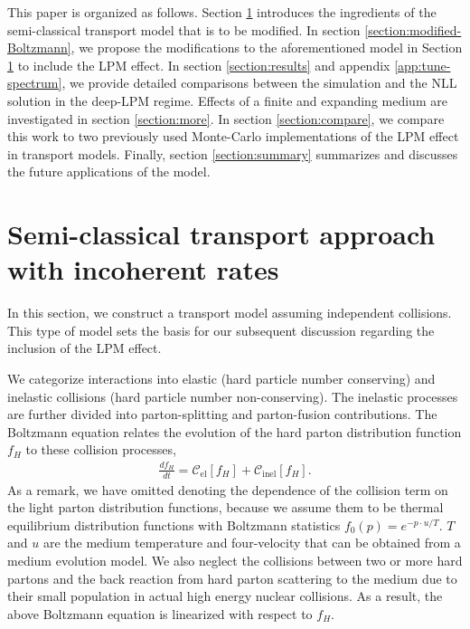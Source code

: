 \documentclass[aps, prc, reprint, amsmath, groupedaddress, nofootinbib]{revtex4-1}
\begin{document}
This paper is organized as follows. 
Section \ref{section:Boltzmann} introduces the ingredients of the semi-classical transport model that is to be modified.
In section \ref{section:modified-Boltzmann}, we propose the modifications to the aforementioned model in Section \ref{section:Boltzmann} to include the LPM effect.
In section \ref{section:results} and appendix \ref{app:tune-spectrum}, we provide detailed comparisons between the simulation and the NLL solution in the deep-LPM regime.
Effects of a finite and expanding medium are investigated in section \ref{section:more}.
In section \ref{section:compare}, we compare this work to two previously used Monte-Carlo implementations of the LPM effect in transport models.
Finally, section \ref{section:summary} summarizes and discusses the future applications of the model.

\section{Semi-classical transport approach with incoherent rates}\label{section:Boltzmann}
In this section, we construct a transport model assuming independent collisions. This type of model sets the basis for our subsequent discussion regarding the inclusion of the LPM effect.

We categorize interactions into elastic (hard particle number conserving) and inelastic collisions (hard particle number non-conserving). 
The inelastic processes are further divided into parton-splitting and parton-fusion contributions. 
The Boltzmann equation relates the evolution of the hard parton distribution function $f_H$ to these collision processes,
\begin{eqnarray}
\frac{df_H}{dt} = \mathcal{C}_{\textrm{el}}[f_H] + \mathcal{C}_{\textrm{inel}}[f_H].
\end{eqnarray}
As a remark, we have omitted denoting the dependence of the collision term on the light parton distribution functions, because we assume them to be thermal equilibrium distribution functions with Boltzmann statistics $f_0(p) = e^{-p\cdot u/T}$. 
$T$ and $u$ are the medium temperature and four-velocity that can be obtained from a medium evolution model. 
We also neglect the collisions between two or more hard partons and the back reaction from hard parton scattering to the medium due to their small population in actual high energy nuclear collisions.
As a result, the above Boltzmann equation is linearized with respect to $f_H$.
\end{document}
